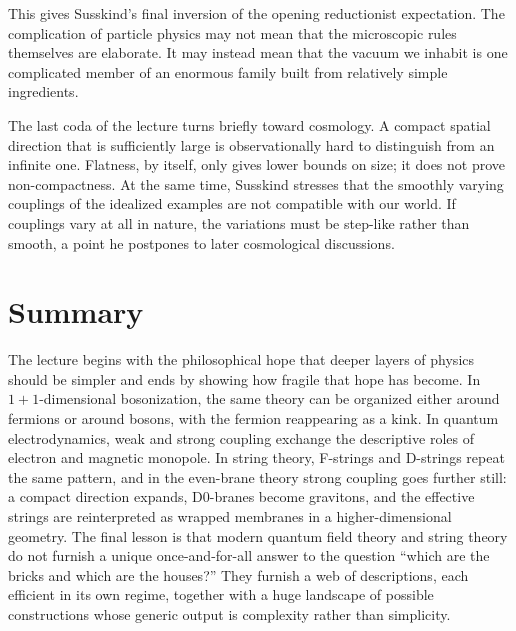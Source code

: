 This gives Susskind's final inversion of the opening reductionist expectation. The complication of particle physics may not mean that the microscopic rules themselves are elaborate. It may instead mean that the vacuum we inhabit is one complicated member of an enormous family built from relatively simple ingredients.

The last coda of the lecture turns briefly toward cosmology. A compact spatial direction that is sufficiently large is observationally hard to distinguish from an infinite one. Flatness, by itself, only gives lower bounds on size; it does not prove non-compactness. At the same time, Susskind stresses that the smoothly varying couplings of the idealized examples are not compatible with our world. If couplings vary at all in nature, the variations must be step-like rather than smooth, a point he postpones to later cosmological discussions.

\section{Summary}

The lecture begins with the philosophical hope that deeper layers of physics should be simpler and ends by showing how fragile that hope has become. In \(1+1\)-dimensional bosonization, the same theory can be organized either around fermions or around bosons, with the fermion reappearing as a kink. In quantum electrodynamics, weak and strong coupling exchange the descriptive roles of electron and magnetic monopole. In string theory, F-strings and D-strings repeat the same pattern, and in the even-brane theory strong coupling goes further still: a compact direction expands, D0-branes become gravitons, and the effective strings are reinterpreted as wrapped membranes in a higher-dimensional geometry. The final lesson is that modern quantum field theory and string theory do not furnish a unique once-and-for-all answer to the question ``which are the bricks and which are the houses?'' They furnish a web of descriptions, each efficient in its own regime, together with a huge landscape of possible constructions whose generic output is complexity rather than simplicity.
